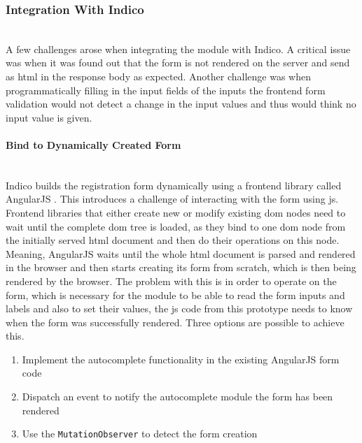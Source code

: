 \vspace{0.5cm}
\subsubsection{Integration With Indico}\mbox{}\\

A few challenges arose when integrating the module with Indico. A critical issue was when it was found out that the form is not rendered on the server and send as \gls{html} in the response body as expected. Another challenge was when programmatically filling in the input fields of the inputs the frontend form validation would not detect a change in the input values and thus would think no input value is given.

\vspace{0.5cm}
\paragraph{Bind to Dynamically Created Form}\mbox{}\\

Indico builds the registration form dynamically using a frontend library called AngularJS \cite{angularjs}. This introduces a challenge of interacting with the form using \gls{js}. Frontend libraries that either create new or modify existing \gls{dom} nodes need to wait until the complete \gls{dom} tree is loaded, as they bind to one \gls{dom} node from the initially served \gls{html} document and then do their operations on this node. Meaning, AngularJS waits until the whole \gls{html} document is parsed and rendered in the browser and then starts creating its form from scratch, which is then being rendered by the browser. The problem with this is in order to operate on the form, which is necessary for the module to be able to read the form inputs and labels and also to set their values, the \gls{js} code from this prototype needs to know when the form was successfully rendered. Three options are possible to achieve this.

\begin{enumerate}
    \item Implement the autocomplete functionality in the existing AngularJS form code
    \item Dispatch an event to notify the autocomplete module the form has been rendered
    \item Use the \texttt{MutationObserver} to detect the form creation
\end{enumerate}

